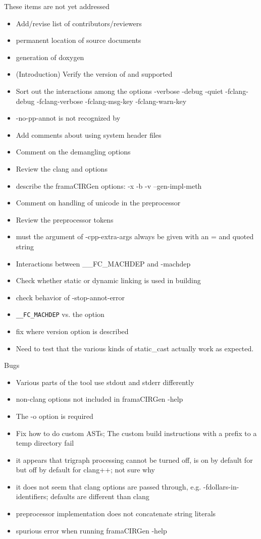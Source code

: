 \documentclass[web]{frama-c-book}
\begin{document}
These items are not yet addressed
\begin{itemize}
\item Add/revise list of contributors/reviewers
\item permanent location of source documents
\item generation of doxygen
\item (Introduction) Verify the version of \framac and \clang supported
\item Sort out the interactions among the options -verbose -debug -quiet -fclang-debug -fclang-verbose -fclang-msg-key -fclang-warn-key
\item -no-pp-annot is not recognized by \fclang
\item Add comments about using system header files
\item Comment on the demangling options
\item Review the clang and \irg options
\item describe the framaCIRGen options: -x -b -v --gen-impl-meth
\item Comment on handling of unicode in the preprocessor
\item Review the preprocessor tokens
\item must the argument of -cpp-extra-args always be given with an = and quoted string
\item Interactions between \_\_FC\_MACHDEP and -machdep
\item Check whether static or dynamic linking is used in building
\item check behavior of -stop-annot-error
\item \lstinline|__FC_MACHDEP| vs. the option
\item fix where version option is described
\item Need to test that the various kinds of static\_cast actually work as expected.
\end{itemize}

Bugs
\begin{itemize}
\item Various parts of the tool use stdout and stderr differently
\item non-clang options not included in framaCIRGen -help
\item The -o option is required
\item Fix how to do custom ASTs; The custom build instructions with a prefix to a temp directory fail
\item it appears that trigraph processing cannot be turned off, is on by default for \irg but off by default for clang++; not sure why
\item it does not seem that clang options are passed through, e.g. -fdollars-in-identifiers; \irg defaults are different than clang
\item preprocessor implementation does not concatenate string literals
\item spurious error when running  framaCIRGen -help
\end{itemize}
\end{document}
